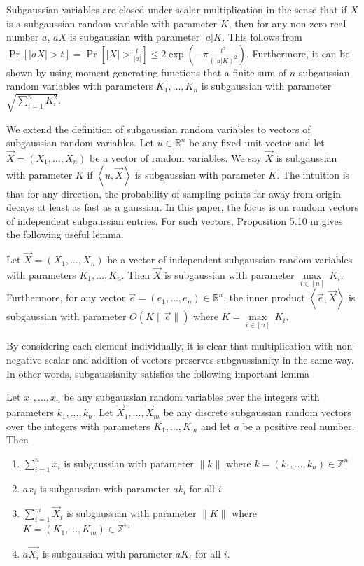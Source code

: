 Subgaussian variables are closed under scalar multiplication in the sense that if $X$ is a subgaussian random variable with parameter $K$, then for any non-zero real number $a$, $aX$ is subgaussian with parameter $|a|K$. This follows from $\operatorname{Pr}[|aX|>t] = \operatorname{Pr}[|X|>\frac{t}{|a|}] \leq 2\exp\left(- \pi \frac{t^2}{(|a|K)^2}\right)$. Furthermore, it can be shown by using moment generating functions that a finite sum of $n$ subgaussian random variables with parameters $K_1, \dots, K_n$ is subgaussian with parameter $\sqrt{\sum_{i=1}^n K_i^2}$.

We extend the definition of subgaussian random variables to vectors of subgaussian random variables. Let $u \in \mathbb{R}^n$ be any fixed unit vector and let $\vec{X} = (X_1, \dots, X_n)$ be a vector of random variables. We say $\vec{X}$ is subgaussian with parameter $K$ if $\left\langle u,\vec{X} \right\rangle$ is subgaussian with parameter $K$. The intuition is that for any direction, the probability of sampling points far away from origin decays at least as fast as a gaussian. In this paper, the focus is on random vectors of independent subgaussian entries. For such vectors, Proposition 5.10 in \cite{vershynin2011introduction} gives the following useful lemma.
\begin{lemma}\label{lemma:Ver12}
    Let $\vec{X} = (X_1, \dots, X_n)$ be a vector of independent subgaussian random variables with parameters $K_1, \dots, K_n$. Then $\vec{X}$ is subgaussian with parameter $\underset{i \in [n]}{\max} \ K_i$. Furthermore, for any vector $\vec{e} = (e_1, \dots, e_n) \in \mathbb{R}^n$, the inner product $\left\langle \vec{e}, \vec{X} \right\rangle$ is subgaussian with parameter $O(K\|\vec{e}\|)$ where $K = \underset{i \in [n]}{\max} \ K_i$. 
\end{lemma}
By considering each element individually, it is clear that multiplication with non-negative scalar and addition of vectors preserves subgaussianity in the same way. In other words, subgaussianity satisfies the following important lemma
\begin{lemma}\label{lemma:add-subgaussian}
    Let $x_1, \dots, x_n$ be any subgaussian random variables over the integers with parameters $k_1, \dots, k_n$. Let $\vec{X}_1, \dots, \vec{X}_m$ be any discrete subgaussian random vectors over the integers with parameters $K_1, \dots, K_m$ and let $a$ be a positive real number. Then
    \begin{enumerate}
        \item $\sum_{i=1}^n x_i$ is subgaussian with parameter $\|k\|$ where $k = (k_1, \dots, k_n) \in \mathbb{Z}^n$
        \item $ax_i$ is subgaussian with parameter $ak_i$ for all $i$.
        \item $\sum_{i=1}^m \vec{X}_i$ is subgaussian with parameter $\|K\|$ where $K = (K_1, \dots, K_m) \in \mathbb{Z}^m$
        \item $a\vec{X_i}$ is subgaussian with parameter $aK_i$ for all $i$.
    \end{enumerate}
\end{lemma}
